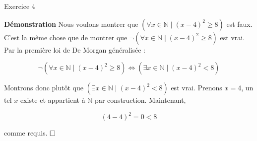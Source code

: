 \documentclass{article}
\begin{document}
Exercice 4

\vspace{0.5cm}

\textbf{Démonstration} Nous voulons montrer que $(\forall x \in \mathbb{N} \mid (x - 4)^2 \geq 8)$ est faux. C'est la même chose que de montrer que $ \neg (\forall x \in \mathbb{N} \mid (x - 4)^2 \geq 8)$ est vrai. Par la première loi de De Morgan généralisée :

$$ \neg (\forall x \in \mathbb{N} \mid (x - 4)^2 \geq 8) \iff (\exists x \in \mathbb{N} \mid (x - 4)^2 < 8) $$

Montrons donc plutôt que $ (\exists x \in \mathbb{N} \mid (x - 4)^2 < 8)$ est vrai. Prenons $x = 4$, un tel $x$ existe et appartient à $\mathbb{N}$ par construction. Maintenant,

$$(4 - 4)^2 = 0 < 8 $$

comme requis.
$\hfill \square$
\end{document}
